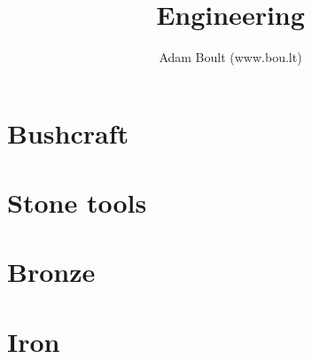 \documentclass[oneside]{book}
\begin{document}
\author{Adam Boult (www.bou.lt)}
\title{Engineering}
\maketitle

\setcounter{tocdepth}{0}
\tableofcontents



\part{Bushcraft}

\part{Stone tools}

\part{Bronze}

\part{Iron}
\end{document}
